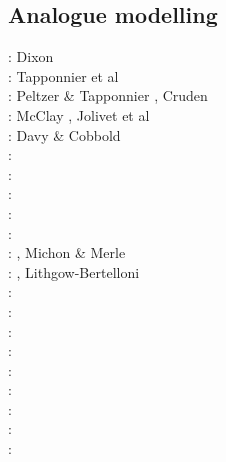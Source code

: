 \subsection{Analogue modelling}

{\scriptsize
\nineteenseventyfive: Dixon \cite{dixo75}\\
\nineteeneightytwo: Tapponnier et al \cite{tapl82}\\
\nineteeneightyeight: Peltzer \& Tapponnier \cite{peta88}, Cruden \cite{crud88}\\
\nineteenninety: McClay \cite{mccl90}, Jolivet et al \cite{jodc90}\\
\nineteenninetyone: Davy \& Cobbold \cite{daco91}\\
\nineteenninetytwo: \cite{salt92}\\
\nineteenninetythree: \cite{nabr93}\cite{shem93}\\
\nineteenninetyseven: \cite{vank97}\\
\nineteenninetyeight: \cite{bubr98}\\
\nineteenninetynine: \cite{dava99}\cite{befo99}\cite{fagd99}\cite{nagg99}\\
\twothousand: \cite{sche00}\cite{sobm00}\cite{chlb00}, Michon \& Merle \cite{mime00}\\
\twothousandone: \cite{haki01}\cite{chys01}, Lithgow-Bertelloni \cite{lirc01}\\
\twothousandtwo: \cite{dagl02}\\
\twothousandthree: \cite{smbs03}\cite{muso03}\cite{nagv03}\\
\twothousandfour: \cite{sche04}\cite{sche04b}\\
\twothousandfive: \cite{jujb05}\cite{sche05}\cite{sobb05}\\
\twothousandsix: \cite{scbb06}\cite{tibs06}\cite{crnp06}\cite{lemm06}\cite{pabs06}\cite{malm06}\\
\twothousandseven: \cite{socb07}\\
\twothousandeight: \cite{clbz08}\cite{fufh08}\cite{esfm08}\\
\twothousandnine: \cite{pina09}\cite{bonn09}\\
\twothousandeleven: \cite{dalt11}\cite{gopc11}\cite{grhd11}\\
}

